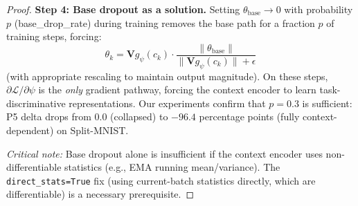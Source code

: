 \documentclass[10pt,a4paper]{amsart}
\begin{document}
\begin{proof}
\textbf{Step 4: Base dropout as a solution.}
Setting $\theta_\mathrm{base} \to 0$ with probability $p$ (base\_drop\_rate) during training removes the base path for a fraction $p$ of training steps, forcing:
\begin{equation}
    \theta_k = \mathbf{V} g_\psi(c_k) \cdot \frac{\|\theta_\mathrm{base}\|}{\|\mathbf{V} g_\psi(c_k)\| + \epsilon}
\end{equation}
(with appropriate rescaling to maintain output magnitude). On these steps, $\partial \mathcal{L}/\partial \psi$ is the \emph{only} gradient pathway, forcing the context encoder to learn task-discriminative representations. Our experiments confirm that $p = 0.3$ is sufficient: P5 delta drops from $0.0$ (collapsed) to $-96.4$ percentage points (fully context-dependent) on Split-MNIST.

\emph{Critical note:} Base dropout alone is insufficient if the context encoder uses non-differentiable statistics (e.g., EMA running mean/variance). The \texttt{direct\_stats=True} fix (using current-batch statistics directly, which are differentiable) is a necessary prerequisite.
\end{proof}
\end{document}

